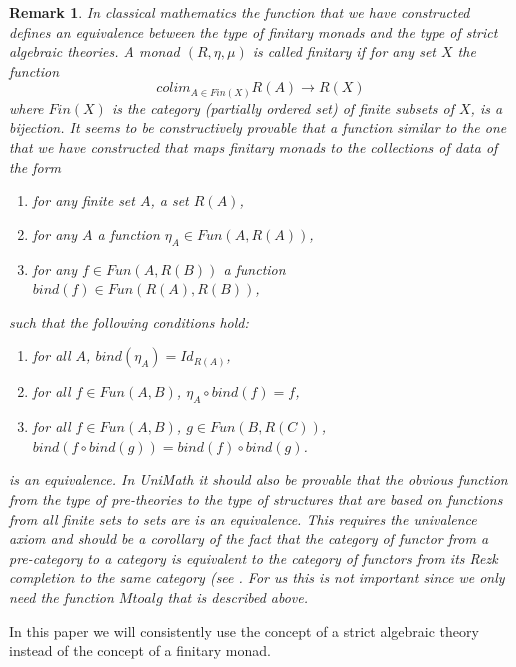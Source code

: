 \documentclass[11pt]{article}
\newtheorem{remark}[proposition]{Remark}
\newcommand{\sr}{\rightarrow}
\newcommand{\bind}{bind}
\begin{document}
\begin{remark}\rm
In classical mathematics the function that we have constructed defines an equivalence between the type of finitary monads and the type of strict algebraic theories. A monad $(R,\eta,\mu)$ is called finitary if for any set $X$ the function
%
$$colim_{A\in Fin(X)}R(A)\sr R(X)$$
%
where $Fin(X)$ is the category (partially ordered set) of finite subsets of $X$, is a bijection. It seems to be constructively provable that a function similar to the one that we have constructed that maps finitary monads to the collections of data of the form
%
\begin{enumerate}
\item for any finite set $A$, a set $R(A)$, 
\item for any $A$ a function $\eta_{A}\in Fun(A,R(A))$,
\item for any $f\in Fun(A,R(B))$ a function $\bind(f)\in Fun(R(A),R(B))$,
\end{enumerate}
%
such that the following conditions hold:
%
\begin{enumerate}
\item for all $A$, $\bind(\eta_A)=Id_{R(A)}$,
\item for all $f\in Fun(A,B)$, $\eta_A\circ \bind(f)=f$,
\item for all $f\in Fun(A,B)$, $g\in Fun(B,R(C))$, $\bind(f\circ \bind(g))=\bind(f)\circ \bind(g)$.
\end{enumerate}
%
is an equivalence. In UniMath it should also be provable that the obvious function from the type of pre-theories to the type of structures that are based on functions from all finite sets to sets are is an equivalence. This requires the univalence axiom and should be a corollary of the fact that the category of functor from a pre-category to a category is equivalent to the category of functors from its Rezk completion to the same category (see \cite{RezkCompletion}. For us this is not important since we only need the function $Mtoalg$ that is described above. 
\end{remark}
%
In this paper we will consistently use the concept of a strict algebraic theory instead of the concept of a finitary monad.  
\end{document}
